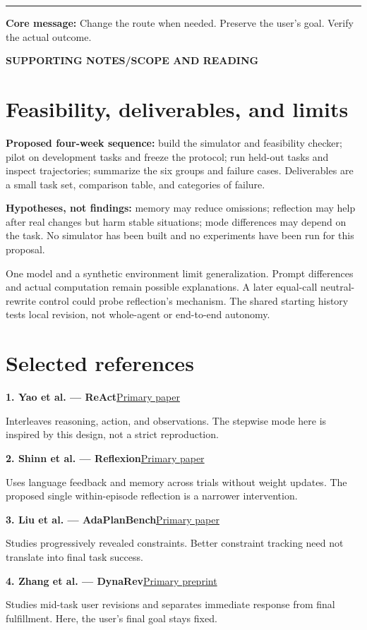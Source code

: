 \documentclass[11pt,a4paper]{article}
\newcommand{\kicker}[1]{{\sffamily\small\bfseries\color{teal}#1}\par}
\newcommand{\refitem}[3]{\par\textbf{#1}\quad\href{#2}{#3}\par}
\begin{document}
\vfill
{\color{teal}\rule{\linewidth}{0.7pt}}
\textbf{Core message:} Change the route when needed. Preserve the user's goal. Verify the actual outcome.

\newpage
\kicker{SUPPORTING NOTES\quad /\quad SCOPE AND READING}
\section{Feasibility, deliverables, and limits}
\textbf{Proposed four-week sequence:} build the simulator and feasibility checker; pilot on development tasks and freeze the protocol; run held-out tasks and inspect trajectories; summarize the six groups and failure cases. Deliverables are a small task set, comparison table, and categories of failure.

\textbf{Hypotheses, not findings:} memory may reduce omissions; reflection may help after real changes but harm stable situations; mode differences may depend on the task. No simulator has been built and no experiments have been run for this proposal.

One model and a synthetic environment limit generalization. Prompt differences and actual computation remain possible explanations. A later equal-call neutral-rewrite control could probe reflection's mechanism. The shared starting history tests local revision, not whole-agent or end-to-end autonomy.

\section{Selected references}
\refitem{1. Yao et al. — ReAct}{https://arxiv.org/abs/2210.03629v3}{Primary paper}
Interleaves reasoning, action, and observations. The stepwise mode here is inspired by this design, not a strict reproduction.

\refitem{2. Shinn et al. — Reflexion}{https://arxiv.org/abs/2303.11366v4}{Primary paper}
Uses language feedback and memory across trials without weight updates. The proposed single within-episode reflection is a narrower intervention.

\refitem{3. Liu et al. — AdaPlanBench}{https://arxiv.org/html/2606.05622v2}{Primary paper}
Studies progressively revealed constraints. Better constraint tracking need not translate into final task success.

\refitem{4. Zhang et al. — DynaRev}{https://arxiv.org/html/2610.40133v1}{Primary preprint}
Studies mid-task user revisions and separates immediate response from final fulfillment. Here, the user's final goal stays fixed.
\end{document}
